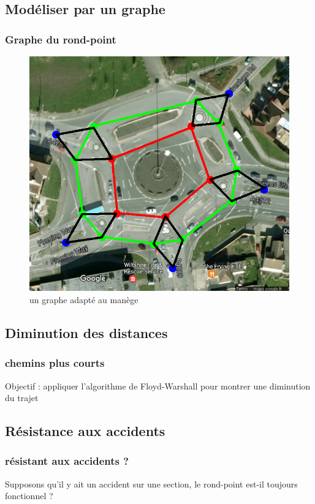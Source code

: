 \documentclass[slidetop,11pt]{beamer}
\begin{document}
	\subsection{Modéliser par un graphe}
\begin{frame}
	\frametitle{Graphe du rond-point}
	\begin{figure}
		\begin{center}
			\includegraphics[scale=0.3]{../manege-graphe}
		\end{center}
		\caption{un graphe adapté au manège}
	\end{figure}
\end{frame}

	\subsection{Diminution des distances}

\begin{frame}

	\frametitle{chemins plus courts}
	Objectif : appliquer l'algorithme de Floyd-Warshall pour montrer une diminution du trajet
\end{frame}

	\subsection{Résistance aux accidents}

\begin{frame}
	\frametitle{résistant aux accidents ?}
	Supposons qu'il y ait un accident sur une section, le rond-point est-il toujours fonctionnel ?
\end{frame}
\end{document}
